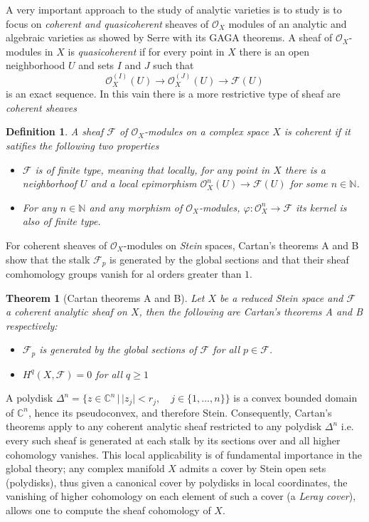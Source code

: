 \documentclass[12pt,twoside,a4paper]{report}
\newtheorem{definition}{Definition}[section]
\newtheorem{theorem}{Theorem}[section]
\newcommand{\nat}{\ensuremath{ \mathbb N }}
\newcommand{\con}{\ensuremath{\mathbb{C}^n}}
\newcommand{\osheaf}{\ensuremath{\mathcal O }}
\newcommand{\fsheaf}{\ensuremath{\mathcal F }}
\begin{document}
  A very important approach to the study of analytic varieties is to study is to focus on \emph{coherent and quasicoherent} sheaves of $\osheaf_X$ modules of an analytic and algebraic varieties as showed by Serre with its GAGA theorems. A sheaf of $\osheaf_X$-modules in $X$ is \emph{quasicoherent} if for every point in $X$ there is an open neighborhood $U$ and sets $I$ and $J$ such that
    \[
      \osheaf^{(I)}_X(U)\to\osheaf^{(J)}_X(U)\to\fsheaf(U)
    \]
  is an  exact sequence. In this vain there is a more restrictive type of sheaf are \emph{coherent sheaves}
  \begin{definition}
    A sheaf $\fsheaf$ of $\osheaf_X$-modules on a complex space $X$ is coherent if it satifies the following two properties
  \begin{itemize}
    \item $\fsheaf$ is of finite type, meaning that locally, for any point in $X$ there is a neighborhoof $U$ and a local epimorphism $\osheaf^{n}_X(U)\to\fsheaf(U)$ for some $n\in\nat$.
    \item For any $n\in\nat$ and any morphism of $\osheaf_X$-modules, $\varphi:\osheaf^{n}_X\to\fsheaf$ its kernel is also of finite type.
  \end{itemize}
  \end{definition}
  For coherent sheaves of $\osheaf_X$-modules on \emph{Stein} spaces, Cartan's theorems A and B show that the stalk $\fsheaf_p$ is generated by the global sections and that their sheaf comhomology groups vanish for al orders greater than $1$. 

  \begin{theorem}[Cartan theorems A and B]\label{CartanAB}
    Let $X$ be a reduced Stein space and $\fsheaf$ a coherent analytic sheaf on $X$, then the following are Cartan's theorems A and B respectively:
  \begin{itemize}
    \item[A:]$\fsheaf_p$ is generated by the global  sections of $\fsheaf$ for all $p\in\fsheaf$.
    \item[B:]$H^q(X,\fsheaf)=0$ for all $q\geq 1$
  \end{itemize}
    \end{theorem}
  A polydisk $\Delta^n=\{z\in\con\,|\,|z_j|<r_j,\quad j\in\{1,\dots,n\}\}$ is a convex bounded domain of $\con$, hence its pseudoconvex, and therefore Stein. Consequently, Cartan's theorems apply to any coherent analytic sheaf restricted to any polydisk $\Delta^n$ i.e. every such sheaf is generated at each stalk by its sections over and all higher cohomology vanishes. This local applicability is of fundamental importance in the global theory; any complex manifold $X$ admits a cover by Stein open sets (polydisks), thus given a canonical cover by polydisks in local coordinates, the vanishing of higher cohomology on each element of such a cover (a \emph{Leray cover}), allows one to compute the sheaf cohomology of $X$.
\end{document}
